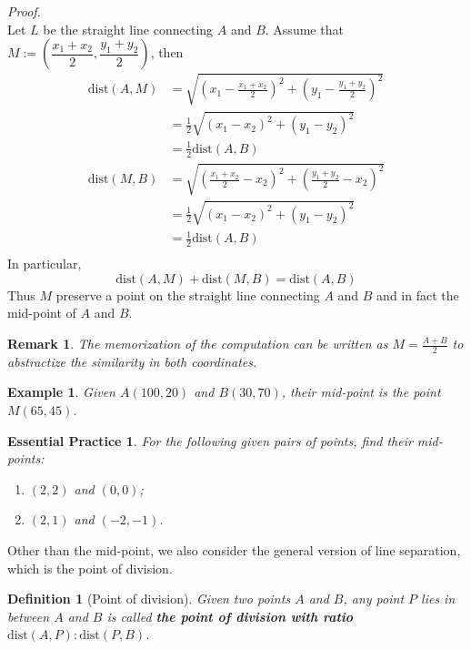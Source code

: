 \documentclass[12pt]{article}
\newtheorem{definition}{Definition}[section]
\newtheorem*{remark}{Remark}
\newtheorem*{example}{Example}
\newtheorem{exercise}{Essential Practice}[subsection]
\renewenvironment{proof}[1][Proof]{\begin{snugshade*} \textit{{#1}.}\\}{\hfill \qedsymbol \end{snugshade*}}
\begin{document}
    \begin{proof}
        Let $L$ be the straight line connecting $A$ and $B$. Assume that $M:=(\dfrac{x_1+x_2}{2},\dfrac{y_1+y_2}{2})$, then\begin{align*}
            \mathrm{dist}(A,M)&=\sqrt{(x_1-\frac{x_1+x_2}{2})^2+(y_1-\frac{y_1+y_2}{2})^2}\\
            &=\frac{1}{2}\sqrt{(x_1-x_2)^2+(y_1-y_2)^2}\\
            &=\frac{1}{2}\mathrm{dist}(A,B)\\
            \mathrm{dist}(M,B)&=\sqrt{(\frac{x_1+x_2}{2}-x_2)^2+(\frac{y_1+y_2}{2}-x_2)^2}\\
            &=\frac{1}{2}\sqrt{(x_1-x_2)^2+(y_1-y_2)^2}\\
            &=\frac{1}{2}\mathrm{dist}(A,B)\\
        \end{align*}
        In particular, $$\mathrm{dist}(A,M)+\mathrm{dist}(M,B)=\mathrm{dist}(A,B)$$
        Thus $M$ preserve a point on the straight line connecting $A$ and $B$ and in fact the mid-point of $A$ and $B$.
    \end{proof}

    \begin{remark}
        The memorization of the computation can be written as $M=\frac{A+B}{2}$ to abstractize the similarity in both coordinates.
    \end{remark}

    \begin{example}
        Given $A(100,20)$ and $B(30,70)$, their mid-point is the point $M(65,45)$.
    \end{example}

    \begin{exercise}
        For the following given pairs of points, find their mid-points:\begin{enumerate}
            \item $(2,2)$ and $(0,0)$;
            \item $(2,1)$ and $(-2,-1)$.
        \end{enumerate}
    \end{exercise}

    Other than the mid-point, we also consider the general version of line separation, which is the point of division.

    \begin{definition}[Point of division]
        Given two points $A$ and $B$, any point $P$ lies in between $A$ and $B$ is called \textbf{the point of division with ratio $\mathrm{dist}(A,P):\mathrm{dist}(P,B)$}.
    \end{definition}
\end{document}
